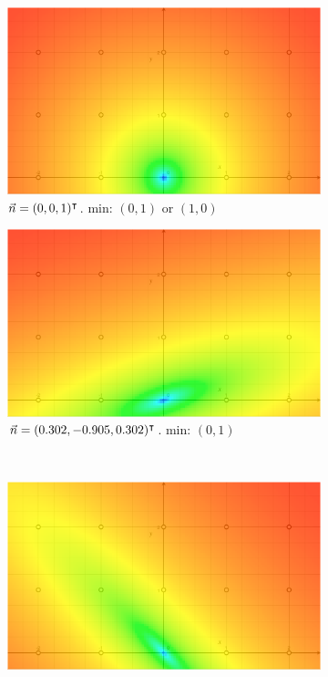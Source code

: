\begin{figure}[h]
\begin{subfigure}{.48\textwidth}
	\includegraphics[width=\linewidth]{fig/lmin/0-0-1.pdf}
	\caption{$\vec{n} = (0, 0, 1)^\intercal$. min: $(0, 1)$ or $(1, 0)$}
\end{subfigure}%
\hfill%
\begin{subfigure}{.48\textwidth}
	\includegraphics[width=\linewidth]{fig/lmin/1--3-1.pdf}
	\caption{$\vec{n} = (0.302, -0.905, 0.302)^\intercal$. min: $(0, 1)$}
\end{subfigure}\\
\begin{subfigure}{.48\textwidth}
	\includegraphics[width=\linewidth]{fig/lmin/3-3-1.pdf}

\end{subfigure}
\end{figure}
